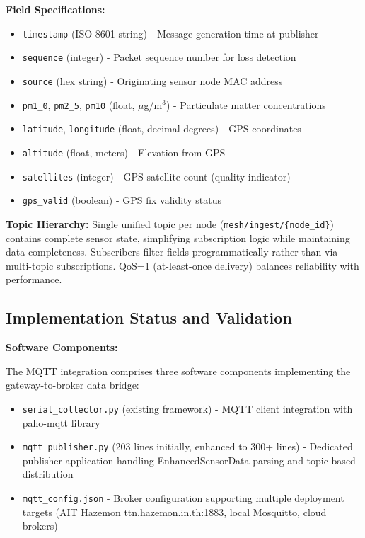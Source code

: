 \textbf{Field Specifications:}
\begin{itemize}
\item \texttt{timestamp} (ISO 8601 string) - Message generation time at publisher
\item \texttt{sequence} (integer) - Packet sequence number for loss detection
\item \texttt{source} (hex string) - Originating sensor node MAC address
\item \texttt{pm1\_0}, \texttt{pm2\_5}, \texttt{pm10} (float, $\mu$g/m$^3$) - Particulate matter concentrations
\item \texttt{latitude}, \texttt{longitude} (float, decimal degrees) - GPS coordinates
\item \texttt{altitude} (float, meters) - Elevation from GPS
\item \texttt{satellites} (integer) - GPS satellite count (quality indicator)
\item \texttt{gps\_valid} (boolean) - GPS fix validity status
\end{itemize}

\textbf{Topic Hierarchy:} Single unified topic per node (\texttt{mesh/ingest/\{node\_id\}}) contains complete sensor state, simplifying subscription logic while maintaining data completeness. Subscribers filter fields programmatically rather than via multi-topic subscriptions. QoS=1 (at-least-once delivery) balances reliability with performance.

\subsection{Implementation Status and Validation}

\textbf{Software Components:}

The MQTT integration comprises three software components implementing the gateway-to-broker data bridge:

\begin{itemize}
\item \texttt{serial\_collector.py} (existing framework) - MQTT client integration with paho-mqtt library
\item \texttt{mqtt\_publisher.py} (203 lines initially, enhanced to 300+ lines) - Dedicated publisher application handling EnhancedSensorData parsing and topic-based distribution
\item \texttt{mqtt\_config.json} - Broker configuration supporting multiple deployment targets (AIT Hazemon ttn.hazemon.in.th:1883, local Mosquitto, cloud brokers)
\end{itemize}

